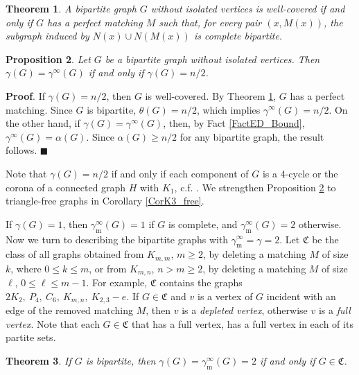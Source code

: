\documentclass[12pt]{article}%
\newtheorem{theorem}{Theorem}[section]
\newtheorem{proposition}[theorem]{Proposition}
\begin{document}
\begin{theorem}
\emph{\cite{rav}} \label{wc} A bipartite graph $G$ without isolated vertices
is well-covered if and only if $G$ has a perfect matching $M$ such that, for
every pair $(x,M(x))$, the subgraph induced by $N(x)\cup N(M(x))$ is complete bipartite.
\end{theorem}

\begin{proposition}
\label{PropBipartite}Let $G$ be a bipartite graph without isolated vertices.
Then $\gamma(G)=\gamma^{\infty}(G)$ if and only if $\gamma(G)=n/2$.
\end{proposition}

\noindent\textbf{Proof}.\hspace{0.1in} If $\gamma(G)=n/2$, then $G$ is
well-covered. By Theorem \ref{wc}, $G$ has a perfect matching. Since $G$ is
bipartite, $\theta(G)=n/2$, which implies $\gamma^{\infty}(G)=n/2$. On the
other hand, if $\gamma(G)=\gamma^{\infty}(G)$, then, by Fact
\ref{FactED_Bound}, $\gamma^{\infty}(G)=\alpha(G)$. Since $\alpha(G)\geq n/2$
for any bipartite graph, the result follows. \hfill$\blacksquare$

\bigskip

Note that $\gamma(G)=n/2$ if and only if each component of $G$ is a 4-cycle or
the corona of a connected graph $H$ with $K_{1}$, c.f. \cite{HHS}. We
strengthen Proposition \ref{PropBipartite} to triangle-free graphs in
Corollary \ref{CorK3_free}.

If $\gamma(G)=1$, then $\gamma_{\mathrm{m}}^{\infty}(G)=1$ if $G$ is complete,
and $\gamma_{\mathrm{m}}^{\infty}(G)=2$ otherwise. Now we turn to describing
the bipartite graphs with $\gamma_{\mathrm{m}}^{\infty}=\gamma=2$. Let
$\mathfrak{C}$ be the class of all graphs obtained from $K_{m,m}$, $m\geq2$,
by deleting a matching $M$ of size $k$, where $0\leq k\leq m$, or from
$K_{m,n}$, $n>m\geq2$, by deleting a matching $M$ of size $\ell$, $0\leq
\ell\leq m-1$. For example, $\mathfrak{C}$ contains the graphs $2K_{2}%
,\ P_{4},\ C_{6},\ K_{m,n},\ K_{2,3}-e$. If $G\in\mathfrak{C}$ and $v$ is a
vertex of $G$ incident with an edge of the removed matching $M$, then $v$ is a
\emph{depleted vertex}, otherwise $v$ is a \emph{full vertex}. Note that each
$G\in\mathfrak{C}$ that has a full vertex, has a full vertex in each of its
partite sets.

\begin{theorem}
If $G$ is bipartite, then $\gamma(G)=\gamma_{\mathrm{m}}^{\infty}(G)=2$ if and
only if $G\in\mathfrak{C}$.
\end{theorem}
\end{document}
